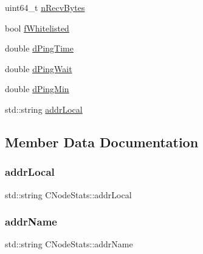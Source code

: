 \begin{DoxyCompactItemize}
\item 
uint64\+\_\+t \mbox{\hyperlink{class_c_node_stats_a1aaec0f47a95487cbd709caf15889663}{n\+Recv\+Bytes}}
\item 
bool \mbox{\hyperlink{class_c_node_stats_a39afa3b5edc1747678667aae5acab3ec}{f\+Whitelisted}}
\item 
double \mbox{\hyperlink{class_c_node_stats_a535c198cbe3af112d4538f535e6618cd}{d\+Ping\+Time}}
\item 
double \mbox{\hyperlink{class_c_node_stats_a03a38f87940d04b321b9fb3102d0368d}{d\+Ping\+Wait}}
\item 
double \mbox{\hyperlink{class_c_node_stats_a42111c41fb3ace057bd32d59f2f774e1}{d\+Ping\+Min}}
\item 
std\+::string \mbox{\hyperlink{class_c_node_stats_a027a5445a0c40e6489875e653be9c758}{addr\+Local}}
\end{DoxyCompactItemize}


\subsection{Member Data Documentation}
\mbox{\label{class_c_node_stats_a027a5445a0c40e6489875e653be9c758}} 
\subsubsection{\texorpdfstring{addr\+Local}{addrLocal}}
{\footnotesize\ttfamily std\+::string C\+Node\+Stats\+::addr\+Local}

\mbox{\label{class_c_node_stats_a3299ecdae870c367fe657f3f59b27e43}} 
\subsubsection{\texorpdfstring{addr\+Name}{addrName}}
{\footnotesize\ttfamily std\+::string C\+Node\+Stats\+::addr\+Name}

\mbox{\label{class_c_node_stats_ad733b840ac9a16a7eb6166ea4984d8a8}} 
